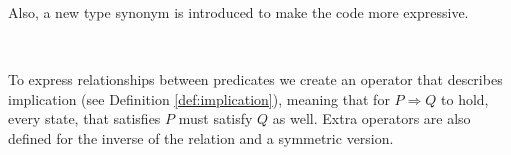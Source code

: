\newpage %

Also, a new type synonym is introduced to make the code more expressive.

\begin{code}
    \>[2]\AgdaSpace{}%
    \AgdaSymbol{:}\AgdaSpace{}%
    \<%
    \\
    \>[2]\AgdaSpace{}%
    \AgdaSymbol{=}\AgdaSpace{}%
    \<%
\end{code}

To express relationships between predicates we create an operator that describes implication (see Definition \ref{def:implication}), meaning that for $P \Rightarrow Q$ to hold, every state, that satisfies $P$ must satisfy $Q$ as well. Extra operators are also defined for the inverse of the relation and a symmetric version.

